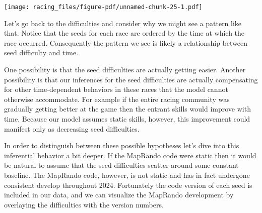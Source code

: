 \documentclass[
  letterpaper,
  DIV=11,
  numbers=noendperiod]{scrartcl}
\begin{document}
\texttt{[image: racing\_files/figure-pdf/unnamed-chunk-25-1.pdf]}

Let's go back to the difficulties and consider why we might see a
pattern like that. Notice that the seeds for each race are ordered by
the time at which the race occurred. Consequently the pattern we see is
likely a relationship between seed difficulty and time.

One possibility is that the seed difficulties are actually getting
easier. Another possibility is that our inferences for the seed
difficulties are actually compensating for other time-dependent
behaviors in these races that the model cannot otherwise accommodate.
For example if the entire racing community was gradually getting better
at the game then the entrant skills would improve with time. Because our
model assumes static skills, however, this improvement could manifest
only as decreasing seed difficulties.

In order to distinguish between these possible hypotheses let's dive
into this inferential behavior a bit deeper. If the MapRando code were
static then it would be natural to assume that the seed difficulties
scatter around some constant baseline. The MapRando code, however, is
not static and has in fact undergone consistent develop throughout 2024.
Fortunately the code version of each seed is included in our data, and
we can visualize the MapRando development by overlaying the difficulties
with the version numbers.
\end{document}
